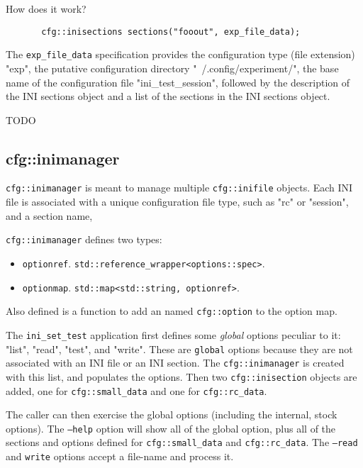   How does it work?

   \begin{verbatim}
       cfg::inisections sections("fooout", exp_file_data);
   \end{verbatim}

   The \texttt{exp\_file\_data} specification provides
   the configuration type (file extension) "exp",
   the putative configuration directory "~/.config/experiment/",
   the base name of the configuration file "ini\_test\_session",
   followed by the description of the INI sections object and
   a list of the sections in the INI sections object.

   TODO

\subsection{cfg::inimanager}
\label{subsec:cfg_namespace_inimanager}
         
   \texttt{cfg::inimanager} is meant to manage multiple
   \texttt{cfg::inifile} objects.
   Each INI file is associated with a unique configuration file type,
   such as "rc" or "session", and a section name,

   \texttt{cfg::inimanager} defines two types:

   \begin{itemize}
      \item \texttt{optionref}.
         \texttt{std::reference\_wrapper<options::spec>}.
      \item \texttt{optionmap}.
         \texttt{std::map<std::string, optionref>}.
   \end{itemize}

   Also defined is a function to add an named \texttt{cfg::option}
   to the option map.

   The \texttt{ini\_set\_test} application first defines some
   \textsl{global} options
   peculiar to it: "list", "read", "test", and "write".
   These are \texttt{global} options because they are not associated with
   an INI file or an INI section.
   The \texttt{cfg::inimanager} is created with this list, and populates
   the options. Then two \texttt{cfg::inisection} objects are
   added, one for \texttt{cfg::small\_data} and
   one for \texttt{cfg::rc\_data}.

   The caller can then exercise the global options (including the internal,
   stock options).  The \texttt{--help} option will show all of the global
   option, plus all of the sections and options defined for
   \texttt{cfg::small\_data} and
   \texttt{cfg::rc\_data}.
   The \texttt{--read} and \texttt{write} options accept a file-name and
   process it.

